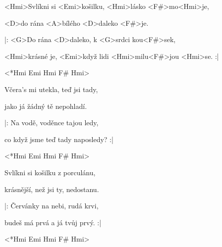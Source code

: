 

\zs
<Hmi>Svlíkni si <Emi>košilku, <Hmi>lásko <F#>mo<Hmi>je,

<D>do rána <A>bílého <D>daleko <F#>je.

|: <G>Do rána <D>daleko, k <G\dim>srdci kou<F#>sek,

<Hmi>krásné je, <Emi>když lidi <Hmi>milu<F#>jou <Hmi>se. :|
\ks

<*Hmi Emi Hmi F# Hmi>

\zs
Včera's mi utekla, teď jsi tady,

jako já žádný tě nepohladí.

|: Na vodě, voděnce tajou ledy,

co když jsme teď tady naposledy? :|
\ks

<*Hmi Emi Hmi F# Hmi>

\zs
Svlíkni si košilku z porculánu,

krásnější, než jsi ty, nedostanu.

|: Červánky na nebi, rudá krvi,

budeš má prvá a já tvůj prvý. :|
\ks

<*Hmi Emi Hmi F# Hmi>

\kp
